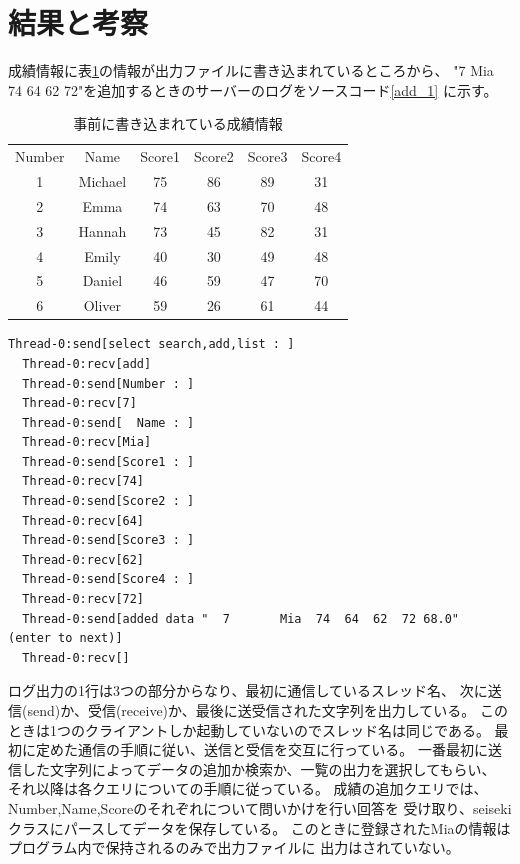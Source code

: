 \documentclass[dvipdfmx]{jsarticle}
\begin{document}
\section{結果と考察}

成績情報に表\ref{out0}の情報が出力ファイルに書き込まれているところから、
"7 Mia 74 64 62 72"を追加するときのサーバーのログをソースコード\ref{add_1}
に示す。
\begin{table}[H]
  \begin{tabular}{cccccc}
    Number & Name    & Score1 & Score2 & Score3 & Score4 \\
    1      & Michael & 75     & 86     & 89     & 31     \\
    2      & Emma    & 74     & 63     & 70     & 48     \\
    3      & Hannah  & 73     & 45     & 82     & 31     \\
    4      & Emily   & 40     & 30     & 49     & 48     \\
    5      & Daniel  & 46     & 59     & 47     & 70     \\
    6      & Oliver  & 59     & 26     & 61     & 44
  \end{tabular}
  \centering
  \caption{事前に書き込まれている成績情報}
  \label{out0}
\end{table}

\begin{lstlisting}[caption=成績情報追加1,label=add_1]
  Thread-0:send[select search,add,list : ]
  Thread-0:recv[add]
  Thread-0:send[Number : ]
  Thread-0:recv[7]
  Thread-0:send[  Name : ]
  Thread-0:recv[Mia]
  Thread-0:send[Score1 : ]
  Thread-0:recv[74]
  Thread-0:send[Score2 : ]
  Thread-0:recv[64]
  Thread-0:send[Score3 : ]
  Thread-0:recv[62]
  Thread-0:send[Score4 : ]
  Thread-0:recv[72]
  Thread-0:send[added data "  7       Mia  74  64  62  72 68.0"  (enter to next)]
  Thread-0:recv[]
\end{lstlisting}

ログ出力の1行は3つの部分からなり、最初に通信しているスレッド名、
次に送信(send)か、受信(receive)か、最後に送受信された文字列を出力している。
このときは1つのクライアントしか起動していないのでスレッド名は同じである。
最初に定めた通信の手順に従い、送信と受信を交互に行っている。
一番最初に送信した文字列によってデータの追加か検索か、一覧の出力を選択してもらい、
それ以降は各クエリについての手順に従っている。
成績の追加クエリでは、Number,Name,Scoreのそれぞれについて問いかけを行い回答を
受け取り、seisekiクラスにパースしてデータを保存している。
このときに登録されたMiaの情報はプログラム内で保持されるのみで出力ファイルに
出力はされていない。
\end{document}
